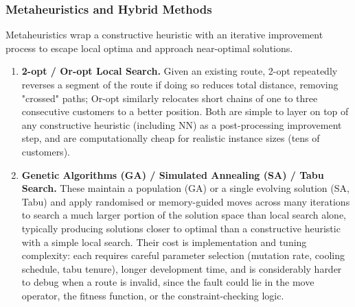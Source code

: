 \documentclass[11pt]{article}
\begin{document}
\subsubsection{Metaheuristics and Hybrid Methods}
Metaheuristics wrap a constructive heuristic with an iterative improvement process to escape local optima and approach near-optimal solutions.

\begin{enumerate}
    \item \textbf{2-opt / Or-opt Local Search.} Given an existing route, 2-opt repeatedly reverses a segment of the route if doing so reduces total distance, removing "crossed" paths; Or-opt similarly relocates short chains of one to three consecutive customers to a better position. Both are simple to layer on top of any constructive heuristic (including NN) as a post-processing improvement step, and are computationally cheap for realistic instance sizes (tens of customers).\cite{ref_2opt}

    \item \textbf{Genetic Algorithms (GA) / Simulated Annealing (SA) / Tabu Search.} These maintain a population (GA) or a single evolving solution (SA, Tabu) and apply randomised or memory-guided moves across many iterations to search a much larger portion of the solution space than local search alone, typically producing solutions closer to optimal than a constructive heuristic with a simple local search. Their cost is implementation and tuning complexity: each requires careful parameter selection (mutation rate, cooling schedule, tabu tenure), longer development time, and is considerably harder to debug when a route is invalid, since the fault could lie in the move operator, the fitness function, or the constraint-checking logic.\cite{ref_metaheuristics}
\end{enumerate}
\end{document}
